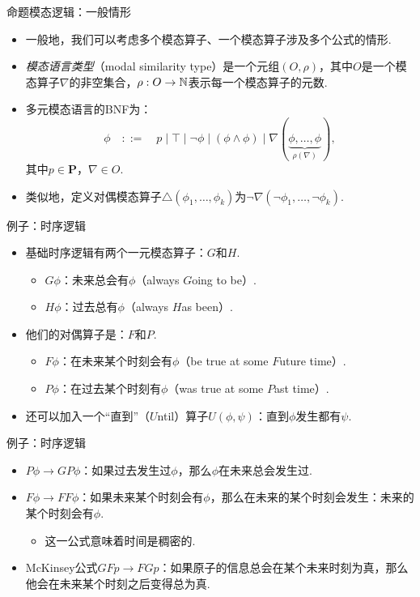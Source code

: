     
    {命题模态逻辑：一般情形}
    \begin{itemize}
        \item 一般地，我们可以考虑多个模态算子、一个模态算子涉及多个公式的情形.
        \item \emph{模态语言类型}（modal similarity type）是一个元组$(O,\rho)$，其中$O$是一个模态算子$\nabla$的非空集合，$\rho:O\to\mathbb{N}$表示每一个模态算子的元数.
        \item 多元模态语言的BNF为：
        \[\phi\quad::=\quad p\mid \top\mid \neg\phi\mid (\phi\wedge\phi)\mid \nabla(\underbrace{\phi,\dots,\phi}_{\rho(\nabla)}),\]
        其中$p\in \mathbf P$，$\nabla\in O$.
        \item 类似地，定义对偶模态算子$\triangle(\phi_1,\dots,\phi_k)$为$\neg\nabla(\neg\phi_1,\dots,\neg\phi_k)$.
    \end{itemize}
    
    
    {例子：时序逻辑}
    \begin{itemize}
        \item 基础时序逻辑有两个一元模态算子：$G$和$H$.
        \begin{itemize}
            \item $G\phi$：未来总会有$\phi$（always $G$oing to be）.
        \item $H\phi$：过去总有$\phi$（always $H$as been）.
        \end{itemize}
        \item 他们的对偶算子是：$F$和$P$.
        \begin{itemize}
             \item $F\phi$：在未来某个时刻会有$\phi$（be true at some $F$uture time）.
        \item $P\phi$：在过去某个时刻有$\phi$（was true at some $P$ast time）.
        \end{itemize}
        \item 还可以加入一个“直到”（$U$ntil）算子$U(\phi,\psi)$：直到$\phi$发生都有$\psi$.
    \end{itemize}
    
    
    {例子：时序逻辑}
    \begin{itemize}
        \item $P\phi\to GP\phi$：如果过去发生过$\phi$，那么$\phi$在未来总会发生过.
        \item $F\phi\to FF\phi$：如果未来某个时刻会有$\phi$，那么在未来的某个时刻会发生：未来的某个时刻会有$\phi$.
        \begin{itemize}
            \item 这一公式意味着时间是稠密的.
        \end{itemize}
        \item McKinsey公式$GF p\to FG p$：如果原子的信息总会在某个未来时刻为真，那么他会在未来某个时刻之后变得总为真.
    \end{itemize}
    
